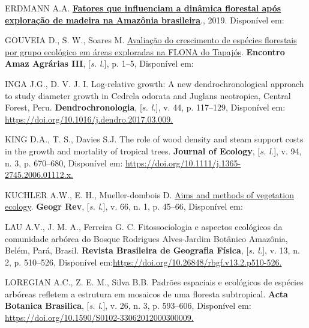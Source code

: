 \documentclass[
]{article}
\newlength{\cslhangindent}
\newlength{\cslentryspacingunit} %
\newenvironment{CSLReferences}[2] %
 {%
  \setlength{\parindent}{0pt}
  \ifodd #1
  \let\oldpar\par
  \def\par{\hangindent=\cslhangindent\oldpar}
  \fi
  \setlength{\parskip}{#2\cslentryspacingunit}
 }%
 {}
\begin{document}
\begin{CSLReferences}{0}{1}
\leavevmode{}%
ERDMANN A.A.
\textbf{\href{https://doi.org/10.11606/T.11.2019.tde-02092019-095634}{Fatores
que influenciam a dinâmica florestal após exploração de madeira na
Amazônia brasileira}}., 2019. Disponível em:

\leavevmode{}%
GOUVEIA D., S. W., Soares M. \href{}{Avaliação do crescimento de
espécies florestais por grupo ecológico em áreas exploradas na FLONA do
Tapajós}. \textbf{Encontro Amaz Agrárias III}, {[}\emph{s. l.}{]}, p.
1--5, Disponível em:

\leavevmode{}%
INGA J.G., D. V. J. I. Log-relative growth: A new dendrochronological
approach to study diameter growth in Cedrela odorata and Juglans
neotropica, Central Forest, Peru. \textbf{Dendrochronologia},
{[}\emph{s. l.}{]}, v. 44, p. 117--129, Disponível em:
\href{https://doi.org/10.1016/j.dendro.2017.03.009}{https://doi.org/10.1016/j.dendro.2017.03.009.
}

\leavevmode{}%
KING D.A., T. S., Davies S.J. The role of wood density and steam support
costs in the growth and mortality of tropical trees. \textbf{Journal of
Ecology}, {[}\emph{s. l.}{]}, v. 94, n. 3, p. 670--680, Disponível em:
\href{https://doi.org/10.1111/j.1365-2745.2006.01112.x}{https://doi.org/10.1111/j.1365-2745.2006.01112.x.
}

\leavevmode{}%
KUCHLER A.W., E. H., Mueller-dombois D. \href{}{Aims and methods of
vegetation ecology}. \textbf{Geogr Rev}, {[}\emph{s. l.}{]}, v. 66, n.
1, p. 45--66, Disponível em:

\leavevmode{}%
LAU A.V., J. M. A., Ferreira G. C. Fitossociologia e aspectos ecológicos
da comunidade arbórea do Bosque Rodrigues Alves-Jardim Botânico
Amazônia, Belém, Pará, Brasil. \textbf{Revista Brasileira de Geografia
Física}, {[}\emph{s. l.}{]}, v. 13, n. 2, p. 510--526, Disponível
em:\href{\%20https://doi.org/10.26848/rbgf.v13.2.p510-526}{https://doi.org/10.26848/rbgf.v13.2.p510-526.
}

\leavevmode{}%
LOREGIAN A.C., Z. E. M., Silva B.B. Padrões espaciais e ecológicos de
espécies arbóreas refletem a estrutura em mosaicos de uma floresta
subtropical. \textbf{Acta Botanica Brasilica}, {[}\emph{s. l.}{]}, v.
26, n. 3, p. 593--606, Disponível em:
\href{https://doi.org/10.1590/S0102-33062012000300009}{https://doi.org/10.1590/S0102-33062012000300009.
}


\end{CSLReferences}
\end{document}
